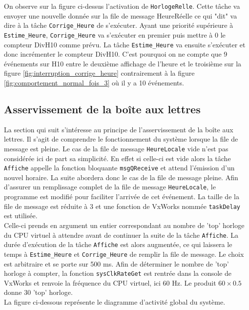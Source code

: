 \documentclass[french]{article}
\begin{document}
	On observe sur la figure ci-dessus l'activation de \texttt{HorlogeRelle}. Cette tâche va envoyer une nouvelle donnée sur la file de message HeureRéelle ce qui "dit" va dire à la tâche \texttt{Corrige\_Heure} de s'exécuter. Ayant une priorité supérieure à \texttt{Estime\_Heure}, \texttt{Corrige\_Heure} va s'exécuter en premier puis mettre à 0 le compteur DivH10 comme prévu. La tâche \texttt{Estime\_Heure} va ensuite s'exécuter et donc incrémenter le compteur DivH10. C'est pourquoi on ne compte que 9 événements sur H10 entre le deuxième affichage de l'heure et le troisième sur la figure \ref{fig:interruption_corrige_heure} contrairement à la figure \ref{fig:comportement_normal_fois_3} où il y a 10 événements.


	\subsection{Asservissement de la boîte aux lettres}	
	
	La section qui suit s'intéresse au principe de l'asservissement de la boîte aux lettres. Il s'agit de comprendre le fonctionnement du système lorsque la file de message est pleine. Le cas de la file de message \texttt{HeureLocale} vide n'est pas considérée ici de part sa simplicité. En effet si celle-ci est vide alors la tâche \texttt{Affiche} appelle la fonction bloquante \texttt{msgQReceive} et attend l'émission d'un nouvel horaire. La suite abordera donc le cas de la file de message pleine. Afin d'assurer un remplissage complet de la file de message \texttt{HeureLocale}, le programme est modifié pour faciliter l'arrivée de cet événement. La taille de la file de message est réduite à 3 et une fonction de VxWorks nommée \texttt{taskDelay} est utilisée.\\
	Celle-ci prends en argument un entier correspondant au nombre de 'top' horloge du CPU virtuel à attendre avant de continuer la suite de la tâche \texttt{Affiche}. La durée d'exécution de la tâche \texttt{Affiche} est alors augmentée, ce qui laissera le temps à \texttt{Estime\_Heure} et \texttt{Corrige\_Heure} de remplir la file de message. Le choix est arbitraire et se porte sur 500 ms. Afin de déterminer le nombre de 'top' horloge à compter, la fonction \texttt{sysClkRateGet} est rentrée dans la console de VxWorks et renvoie la fréquence du CPU virtuel, ici 60 Hz. Le produit $60\times0.5$ donne 30 'top' horloge.\\
	La figure ci-dessous représente le diagramme d'activité global du système.
	
\end{document}
